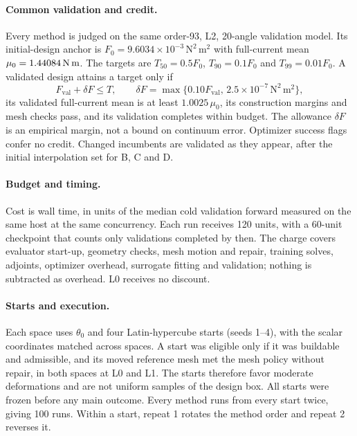 \paragraph{Common validation and credit.}
Every method is judged on the same order-93, L2, 20-angle validation model.
Its initial-design anchor is $F_0=9.6034\times10^{-3}\,\mathrm{N^2\,m^2}$ with
full-current mean $\mu_0=1.44084\,\mathrm{N\,m}$. The targets are $T_{50}=0.5F_0$,
$T_{90}=0.1F_0$ and $T_{99}=0.01F_0$. A validated design attains a target
only if
\begin{equation}
 F_{\mathrm{val}}+\delta F\leq T,\qquad
 \delta F=\max\{0.10F_{\mathrm{val}},\,2.5\times10^{-7}\,\mathrm{N^2\,m^2}\},
\end{equation}
its validated full-current mean is at least $1.0025\,\mu_0$, its
construction margins and mesh checks pass, and its validation completes
within budget. The allowance $\delta F$ is an empirical margin, not a bound
on continuum error. Optimizer success flags confer no credit. Changed
incumbents are validated as they appear, after the initial interpolation
set for B, C and D.

\paragraph{Budget and timing.}
Cost is wall time, in units of the median cold validation forward measured
on the same host at the same concurrency. Each run receives 120 units,
with a 60-unit checkpoint that counts only validations completed by then.
The charge covers evaluator start-up, geometry checks, mesh motion and
repair, training solves, adjoints, optimizer overhead, surrogate fitting
and validation; nothing is subtracted as overhead. L0 receives no discount.

\paragraph{Starts and execution.}
Each space uses $\theta_0$ and four Latin-hypercube starts (seeds 1--4),
with the scalar coordinates matched across spaces. A start was eligible
only if it was buildable and admissible, and its moved reference mesh met
the mesh policy without repair, in both spaces at L0 and L1. The starts
therefore favor moderate deformations and are not uniform samples of the
design box. All starts were frozen before any main outcome. Every method
runs from every start twice, giving 100 runs. Within a start, repeat 1
rotates the method order and repeat 2 reverses it.

